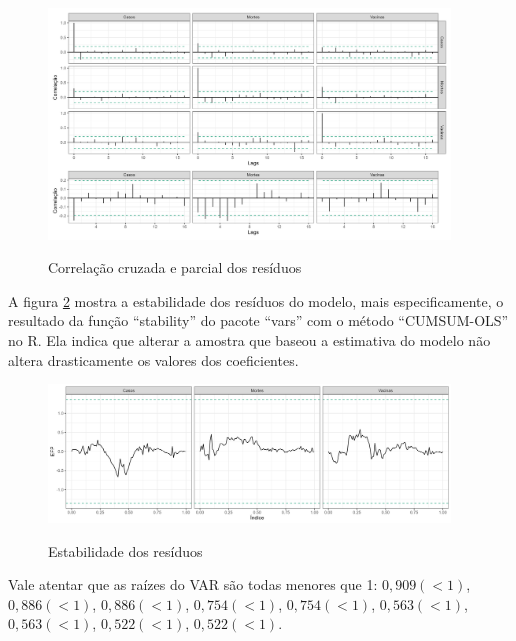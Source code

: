 \documentclass[
    article,
	12pt,				%
	oneside,			%
	a4paper,			%
	english,			%
	brazil,				%
	hyperref = {colorlinks, citecolor=c1d, linkcolor=c2d, urlcolor=c3d, colorlinks}
	]{abntex2}
\begin{document}
\begin{apendicesenv}
\begin{figure}[H]
    \centering
    \caption{Correlação cruzada e parcial dos resíduos}
    \includegraphics[width = 0.95\textwidth]{Figuras/diag_acf.png}
    \label{fig:varresacf}
\end{figure}

A figura \ref{fig:varstab} mostra a estabilidade dos resíduos do modelo, mais especificamente, o resultado da função ``stability'' do pacote ``vars'' com o método ``CUMSUM-OLS'' no R. Ela indica que alterar a amostra que baseou a estimativa do modelo não altera drasticamente os valores dos coeficientes.

\begin{figure}[H]
    \centering
    \caption{Estabilidade dos resíduos}
    \includegraphics[width = 0.95\textwidth]{Figuras/diag_stab.png}
    \label{fig:varstab}
\end{figure}

Vale atentar que as raízes do VAR são todas menores que 1: $0,909 (<1)$,	$0,886 (<1)$,	$0,886 (<1)$,	$0,754 (<1)$,	$0,754 (<1)$,	$0,563 (<1)$,	$0,563 (<1)$,	$0,522 (<1)$,	$0,522 (<1)$.

\newpage

\end{apendicesenv}
\end{document}
